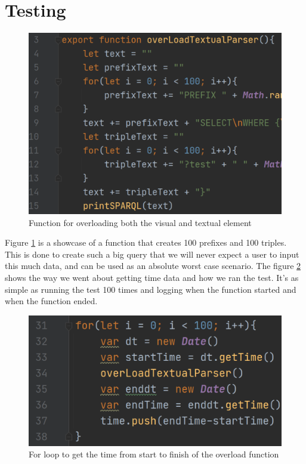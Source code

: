 \section{Testing}
\begin{figure}[H]
    \centering
    \includegraphics[width=1\textwidth]{figures/overloadgeneration.pdf}
    \caption{Function for overloading both the visual and textual element}
    \label{fig:overload}
\end{figure}
Figure \ref{fig:overload} is a showcase of a function that creates 100 prefixes and 100 triples. This is done to create such a big query that we will never expect a user to input this much data, and can be used as an absolute worst case scenario. The figure \ref{fig:time-forloop} shows the way we went about getting time data and how we ran the test. It's as simple as running the test 100 times and logging when the function started and when the function ended.
\begin{figure}[H]
    \centering
    \includegraphics[width=1\textwidth]{figures/time-forloop.pdf}
    \caption{For loop to get the time from start to finish of the overload function}
    \label{fig:time-forloop}
\end{figure}
